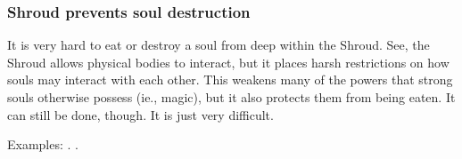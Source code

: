 \subsubsection{Shroud prevents soul destruction}
It is very hard to eat or destroy a soul from deep within the Shroud. 
See, the Shroud allows physical bodies to interact, but it places harsh restrictions on how souls may interact with each other. 
This weakens many of the powers that strong souls otherwise possess (ie., magic), but it also protects them from being eaten. 
It can still be done, though. 
It is just very difficult. 

Examples: 
. 
. 
 

























